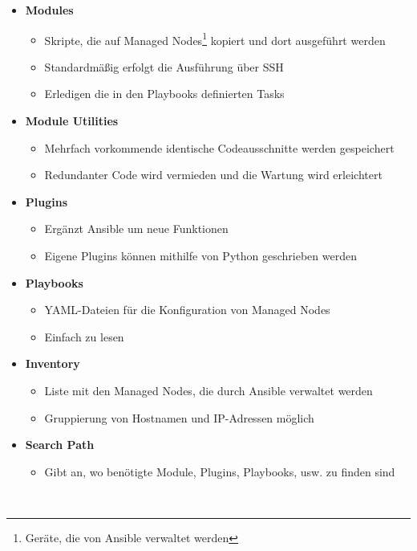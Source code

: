     \begin{itemize}
        \item \textbf{Modules}
        \begin{itemize}[label=$\circ$]
            \item Skripte, die auf Managed Nodes\footnote{Geräte, die von Ansible verwaltet werden} kopiert und dort ausgeführt werden
            \item Standardmäßig erfolgt die Ausführung über SSH
            \item Erledigen die in den Playbooks definierten Tasks
        \end{itemize}
        
        \item \textbf{Module Utilities}
        \begin{itemize}[label=$\circ$]
            \item Mehrfach vorkommende identische Codeausschnitte werden gespeichert
            \item Redundanter Code wird vermieden und die Wartung wird erleichtert
        \end{itemize}
        
        \item \textbf{Plugins}
        \begin{itemize}[label=$\circ$]
            \item Ergänzt Ansible um neue Funktionen
            \item Eigene Plugins können mithilfe von Python geschrieben werden
        \end{itemize}
        
        \item \textbf{Playbooks}
        \begin{itemize}[label=$\circ$]
            \item YAML-Dateien für die Konfiguration von Managed Nodes
            \item Einfach zu lesen
        \end{itemize}
        
        \item \textbf{Inventory}
        \begin{itemize}[label=$\circ$]
            \item Liste mit den Managed Nodes, die durch Ansible verwaltet werden
            \item Gruppierung von Hostnamen und IP-Adressen möglich
            
        \end{itemize}
        
        \item \textbf{Search Path}
        \begin{itemize}[label=$\circ$]
            \item Gibt an, wo benötigte Module, Plugins, Playbooks, usw. zu finden sind
        \end{itemize}
        
    \end{itemize}
    \cite{EA:Web46, EA:Web47} \\


